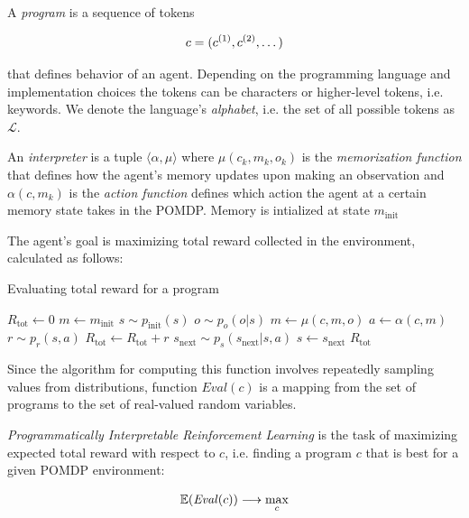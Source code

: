 A \emph{program} is a sequence of tokens

\begin{equation}
    c=(c^{(1)},c^{(2)},\dots)
\end{equation}

that defines behavior of an agent.
Depending on the programming language and implementation choices the tokens can be characters or higher-level tokens, i.e. keywords.
We denote the language's \emph{alphabet}, i.e. the set of all possible tokens as $\mathcal{L}$.

An \emph{interpreter} is a tuple $\langle \alpha,\mu \rangle$ where $\mu(c_k,m_k,o_k)$ is the \emph{memorization function} that defines how the agent's memory updates upon making an observation and $\alpha(c, m_k)$ is the \emph{action function} defines which action the agent at a certain memory state takes in the POMDP.
Memory is intialized at state $m_\text{init}$

The agent's goal is maximizing total reward collected in the environment, calculated as follows:

\begin{algorithm}[H]
\begin{algorithmic}[1]
\caption{Evaluating total reward for a program}
\State $R_\text{tot} \gets 0$
\State $m \gets m_\text{init}$
\State $s \sim p_\text{init}(s)$
\State $o \sim p_o(o | s)$
\State $m \gets \mu(c,m,o)$
\State $a \gets \alpha(c, m)$ 
\State $r \sim p_r(s,a)$
\State $R_\text{tot} \gets R_\text{tot} + r$
\State $s_\text{next} \sim p_s(s_\text{next} | s, a)$
\State $s\gets s_\text{next}$
\EndWhile
\State \Return $R_\text{tot}$
\EndFunction
\end{algorithmic}
\end{algorithm}

Since the algorithm for computing this function involves repeatedly sampling values from distributions, function $\mathit{Eval}(c)$ is a mapping from the set of programs to the set of real-valued random variables.

\emph{Programmatically Interpretable Reinforcement Learning} \cite{pirl} is the task of maximizing expected total reward with respect to $c$, i.e. finding a program $c$ that is best for a given POMDP environment:

\begin{equation}
    \mathbb{E}(\mathit{Eval}(c)) \longrightarrow \max_{c}
    \label{eq:pirlgoal}
\end{equation}

